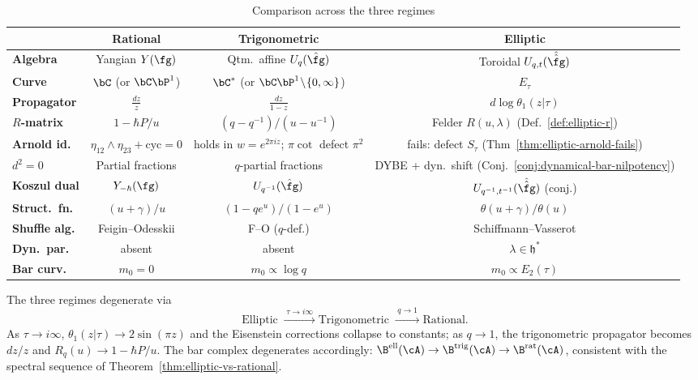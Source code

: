 \begin{table}[ht]
\centering
\caption{Comparison across the three regimes}
\label{tab:rat-trig-ell}
\renewcommand{\arraystretch}{1.35}
{\footnotesize
\begin{tabular}{|l|c|c|c|}
\hline
& \textbf{Rational} & \textbf{Trigonometric} & \textbf{Elliptic} \\
\hline
\textbf{Algebra}
& Yangian $Y(\fg)$
& Qtm.\ affine $U_q(\hat{\fg})$
& Toroidal $U_{q,t}(\hat{\hat{\fg}})$ \\
\hline
\textbf{Curve}
& $\bC$ (or $\bC\bP^1$)
& $\bC^*$ (or $\bC\bP^1 \!\setminus\! \{0,\infty\}$)
& $E_\tau$ \\
\hline
\textbf{Propagator}
& $\frac{dz}{z}$
& $\frac{dz}{1 - z}$
& $d\log\theta_1(z|\tau)$ \\
\hline
\textbf{$R$-matrix}
& $1 - \hbar P/u$
& $(q{-}q^{-1})/(u{-}u^{-1})$
& Felder $R(u,\lambda)$ (Def.~\ref{def:elliptic-r}) \\
\hline
\textbf{Arnold id.}
& $\eta_{12}\!\wedge\!\eta_{23} + \text{cyc} = 0$
& holds in $w = e^{2\pi i z}$; $\pi\cot$ defect $\pi^2$
& fails: defect $S_\tau$ (Thm~\ref{thm:elliptic-arnold-fails}) \\
\hline
\textbf{$d^2\!=\!0$}
& Partial fractions
& $q$-partial fractions
& DYBE + dyn.\ shift (Conj.~\ref{conj:dynamical-bar-nilpotency}) \\
\hline
\textbf{Koszul dual}
& $Y_{-\hbar}(\fg)$
& $U_{q^{-1}}(\hat{\fg})$
& $U_{q^{-1},t^{-1}}(\hat{\hat{\fg}})$ (conj.) \\
\hline
\textbf{Struct.\ fn.}
& $(u{+}\gamma)/u$
& $(1{-}qe^u)/(1{-}e^u)$
& $\theta(u{+}\gamma)/\theta(u)$ \\
\hline
\textbf{Shuffle alg.}
& Feigin--Odesskii
& F--O ($q$-def.)
& Schiffmann--Vasserot \\
\hline
\textbf{Dyn.\ par.}
& absent
& absent
& $\lambda \in \mathfrak{h}^*$ \\
\hline
\textbf{Bar curv.}
& $m_0 = 0$
& $m_0 \propto \log q$
& $m_0 \propto E_2(\tau)$ \\
\hline
\end{tabular}
}
\end{table}

\begin{remark}\label{rem:degeneration-limits}
The three regimes degenerate via
\begin{equation}\label{eq:degeneration-chain}
\text{Elliptic} \;\xrightarrow{\;\tau \to i\infty\;}
\text{Trigonometric} \;\xrightarrow{\;q \to 1\;}
\text{Rational}.
\end{equation}
As $\tau \to i\infty$, $\theta_1(z|\tau) \to 2\sin(\pi z)$ and the Eisenstein corrections collapse to constants; as $q \to 1$, the trigonometric propagator becomes $dz/z$ and $R_q(u) \to 1 - \hbar P/u$. The bar complex degenerates accordingly: $\B^{\mathrm{ell}}(\cA) \to \B^{\mathrm{trig}}(\cA) \to \B^{\mathrm{rat}}(\cA)$, consistent with the spectral sequence of Theorem~\ref{thm:elliptic-vs-rational}.
\end{remark}



